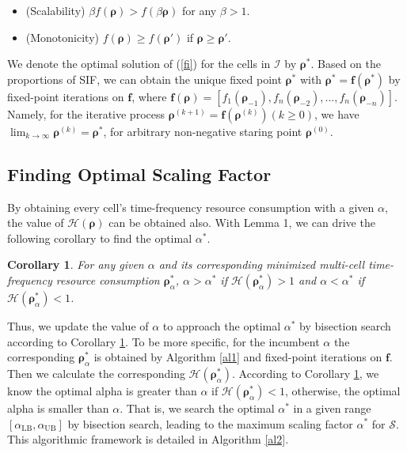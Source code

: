 \documentclass[10pt,journal,final,finalsubmission,twocolumn]{IEEEtran}
\newtheorem{corollary}[theorem]{Corollary}
\begin{document}
\begin{itemize}

\item (Scalability) $\beta f\left(\boldsymbol{\rho}\right)> f\left(\beta\boldsymbol{\rho}\right)$ for any $\beta>1$.

\item (Monotonicity) $f\left(\boldsymbol{\rho}\right) \geq f\left(\boldsymbol{\rho}'\right)$ if $\boldsymbol{\rho} \geq \boldsymbol{\rho}'$.

\end{itemize}

We denote the optimal solution of (\ref{fi}) for the cells in $ \mathcal{I}$ by $\boldsymbol{\rho}^* $. Based on the proportions of SIF, we can obtain the unique fixed point $\boldsymbol{\rho}^*$ with 
$\boldsymbol{\rho}^* = \boldsymbol{f}\left(\boldsymbol{\rho}^*\right)$ by fixed-point iterations on $\boldsymbol{f}$, where $\boldsymbol{f}\left(\boldsymbol{\rho}\right) = \left[ f_1\left(\boldsymbol{\rho}_{-1}\right), f_n\left(\boldsymbol{\rho}_{-2}\right), ..., f_n\left(\boldsymbol{\rho}_{-n}\right)\right]$. Namely, for the iterative process $\boldsymbol{\rho}^{(k+1)} =\boldsymbol{f}\left(\boldsymbol{\rho}^{(k)}\right) (k\geq0)$, we have $\lim_{k\rightarrow \infty }\boldsymbol{\rho}^{(k)}=\boldsymbol{\rho}^*$, for arbitrary non-negative staring point $\boldsymbol{\rho}^{(0)}$.

\subsection{Finding Optimal Scaling Factor}\label{bisection}

 By obtaining every cell's time-frequency resource consumption with a given $\alpha$, the value of $\mathcal{H}(\boldsymbol{\rho})$ can be obtained also. With Lemma 1, we can drive the following corollary to find the optimal $\alpha^*$.

\begin{corollary}\label{canbisection}
For any given $\alpha $ and its corresponding minimized multi-cell time-frequency resource consumption $ \boldsymbol{\rho}^*_\alpha$, $\alpha > \alpha^* $ if $\mathcal{H}(\boldsymbol{\rho}^*_\alpha) > 1$ and $\alpha < \alpha^* $ if $\mathcal{H}(\boldsymbol{\rho}^*_\alpha) < 1$. 
\end{corollary}

Thus, we update the value of $\alpha$ to approach the optimal $\alpha^*$ by bisection search according to Corollary \ref{canbisection}. To be more specific, for the incumbent $\alpha$ the corresponding $\boldsymbol{\rho}^*_\alpha$ is obtained by Algorithm \ref{al1} and fixed-point iterations on $\boldsymbol{f}$. Then we calculate the corresponding $\mathcal{H}(\boldsymbol{\rho}^*_\alpha)$. According to Corollary \ref{canbisection}, we know the optimal alpha is greater than $\alpha$ if  $\mathcal{H}(\boldsymbol{\rho}^*_\alpha)<1$, otherwise, the optimal alpha is smaller than $\alpha$. That is, we search the optimal $\alpha ^*$ in a given range $[\alpha _\text{LB},\alpha _\text{UB} ]$ by bisection search, leading to the maximum scaling factor $\alpha^*$ for $\mathcal{S}$. This algorithmic framework is detailed in Algorithm \ref{al2}. 
\end{document}
